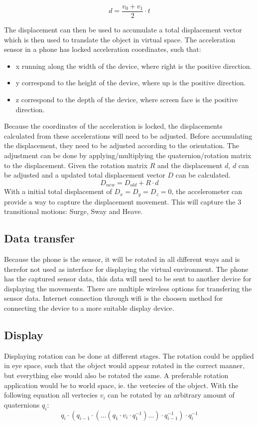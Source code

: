 \begin{equation}
    d = \frac{v_0 + v_1}{2} \cdot t
\end{equation}

The displacement can then be used to accumulate a total displacement vector which is then used to translate the object in virtual space.
The acceleration sensor in a phone has locked acceleration coordinates, such that:
\begin{itemize}
    \item x running along the width of the device, where right is the positive direction.
    \item y correspond to the height of the device, where up is the positive direction.
    \item z correspond to the depth of the device, where screen face is the positive direction.
\end{itemize}   
Because the coordinates of the acceleration is locked, the displacements calculated from these accelerations will need to be adjusted.
Before accumulating the displacement, they need to be adjusted according to the orientation.
The adjustment can be done by applying/multiplying the quaternion/rotation matrix to the displacement.
Given the rotation matrix $R$ and the displacement $d$, $d$ can be adjusted and a updated total displacement vector $D$ can be calculated.
\begin{equation}
    D_{new} = D_{old} + R \cdot d
\end{equation}
With a initial total displacement of $D_x = D_y = D_z = 0$, the accelerometer can provide a way to capture the displacement movement.
This will capture the 3 transitional motions: Surge, Sway and Heave. 


\subsection{Data transfer}
Because the phone is the sensor, it will be rotated in all different ways and is therefor not used as interface for displaying the virtual environment. 
The phone has the captured sensor data, this data will need to be sent to another device for displaying the movements.
There are multiple wireless options for transfering the sensor data. 
Internet connection through wifi is the choosen method for connecting the device to a more suitable display device.

\subsection{Display}
Displaying rotation can be done at different stages. The rotation could be applied in eye space, such that the object would appear rotated in the correct manner, but everything else would also be rotated the same.
A preferable rotation application would be to world space, ie. the vertecies of the object. 
With the following equation all vertecies $v_i$ can be rotated by an arbitrary amount of quaternions $q_i$:
\begin{equation}
    q_i \cdot ( q_{i-1} \cdot ( \ldots (q_1 \cdot v_i \cdot q_1^{-1}) \ldots ) \cdot q_{i-1}^{-1}  )  \cdot q_i^{-1}
\end{equation}


